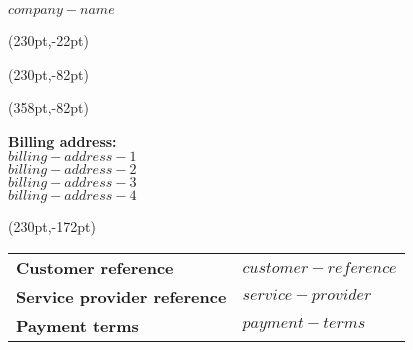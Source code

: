 \documentclass[a4paper,11pt]{article}
\begin{document}
\pagestyle{fancy}
\fancyhf{} %
\renewcommand{\headrulewidth}{0pt}
\renewcommand{\footrulewidth}{0pt}

\setlength{\fboxsep}{1.5em}
\setlength{\parindent}{0pt}

{\huge $company-name$}



\fancyput*(230pt,-22pt){}

\fancyput*(230pt,-82pt){}

\fancyput*(358pt,-82pt){}

\vspace{3em}
\textbf{Billing address:}\\[1em]
$billing-address-1$\\
$billing-address-2$\\
$billing-address-3$\\
$billing-address-4$


\fancyput*(230pt,-172pt){%
    \begin{minipage}{85pt}
      \begin{tabular}{ll}
        \textbf{Customer reference}         & $customer-reference$\\
        \textbf{Service provider reference} & $service-provider$ \\
        \textbf{Payment terms}              & $payment-terms$
      \end{tabular}
    \end{minipage}}

\vspace{15em}


\renewcommand\arraystretch{1.5}
\setcounter{pos}{0}
\end{document}
